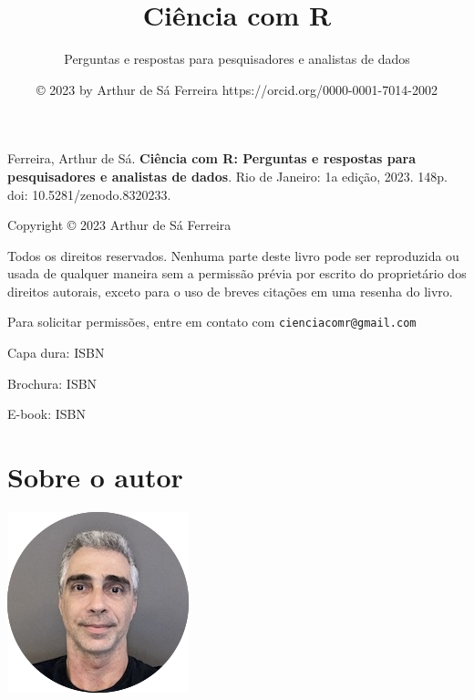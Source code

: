 \documentclass[
  a4paper,
]{book}
\title{\textbf{Ciência com R}}
\subtitle{Perguntas e respostas para pesquisadores e analistas de dados}
\author{© 2023 by Arthur de Sá Ferreira https://orcid.org/0000-0001-7014-2002}
\date{}
\renewcommand{\href}[2]{#2\footnote{\url{#1}}}
\newcommand{\DisableFootNotes}{%
  \renewcommand{\footnote}[2][]{\relax}
}
\begin{document}
\maketitle


\newpage


\newpage

{
\setcounter{tocdepth}{1}
\tableofcontents
}
\listoffigures
\listoftables
\DisableFootNotes

\clearpage
\markboth{}{}

Ferreira, Arthur de Sá. \textbf{Ciência com R: Perguntas e respostas para pesquisadores e analistas de dados}. Rio de Janeiro: 1a edição, 2023. 148p. \href{https://doi.org/10.5281/zenodo.8320233}{doi: 10.5281/zenodo.8320233}.

\vspace*{\fill}

Copyright © 2023 Arthur de Sá Ferreira

Todos os direitos reservados. Nenhuma parte deste livro pode ser reproduzida ou usada de qualquer maneira sem a permissão prévia por escrito do proprietário dos direitos autorais, exceto para o uso de breves citações em uma resenha do livro.

Para solicitar permissões, entre em contato com \href{mailto:cienciacomr@gmail.com}{\nolinkurl{cienciacomr@gmail.com}}

Capa dura: ISBN

Brochura: ISBN

E-book: ISBN

\hypertarget{sobre-o-autor}{%
\chapter*{Sobre o autor}\label{sobre-o-autor}}

\markboth{}{}

\includegraphics{images/ASF.png}
\end{document}
